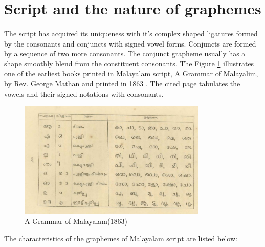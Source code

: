\documentclass[10pt]{article}
\begin{document}
\section{Script and the nature of graphemes}

\paragraph{}
The script has acquired its uniqueness with it's complex shaped ligatures formed by the consonants and conjuncts with signed vowel forms. Conjuncts are formed by a sequence of two more consonants. The conjunct grapheme usually has a shape smoothly blend from the constituent consonants. The Figure \ref{mathan} illustrates one of the earliest books printed in Malayalam script, A Grammar of Malayalim, by Rev. George Mathan and printed in 1863 \cite{georgemathan}. The cited page tabulates the vowels and their signed notations with consonants. 

\begin{figure}[h]
	\centering
	\includegraphics[width=0.8\textwidth]{images/mathanSymbols.png}
	\caption{A Grammar of Malayalam(1863)}
	\label{mathan}
\end{figure} 

The characteristics of the graphemes of Malayalam script are listed below:
\end{document}
